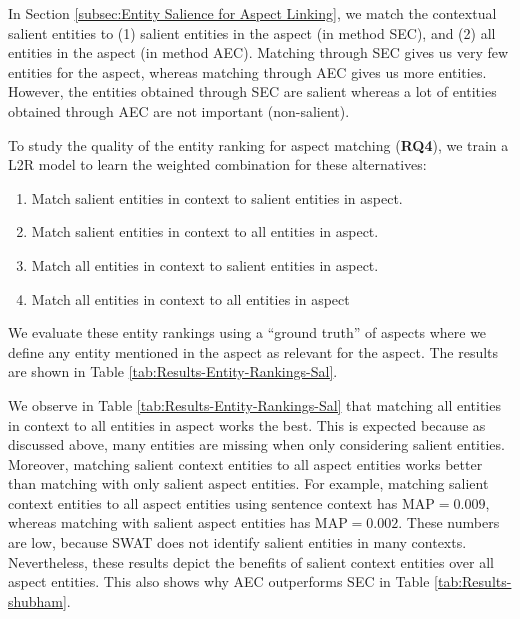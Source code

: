 In Section \ref{subsec:Entity Salience for Aspect Linking}, we match the contextual salient entities to (1) salient entities in the aspect (in method SEC), and (2) all entities in the aspect (in method AEC). Matching through SEC gives us very few entities for the aspect, whereas matching through AEC gives us more entities. However, the entities obtained through SEC are salient whereas a lot of entities obtained through AEC are not important (non-salient). 

To study the quality of the entity ranking for aspect matching (\textbf{RQ4}), we train a L2R model to learn the weighted combination for these alternatives:
\begin{enumerate}
    \item Match salient entities in context to salient entities in aspect.
    \item Match salient entities in context to all entities in aspect.
    \item Match all entities in context to salient entities in aspect.
    \item Match all entities in context to all entities in aspect
\end{enumerate}


We evaluate these entity rankings using a ``ground truth'' of aspects where we define any entity mentioned in the aspect as relevant for the aspect. The results are shown in Table \ref{tab:Results-Entity-Rankings-Sal}. 



We observe in Table \ref{tab:Results-Entity-Rankings-Sal} that matching all entities in context to all entities in aspect works the best. This is expected because as discussed above, many entities are missing when only considering salient entities. Moreover, matching salient context entities to all aspect entities works better than matching with only salient aspect entities. For example, matching salient context entities to all aspect entities using sentence context has $\text{MAP}=0.009$, whereas matching with salient aspect entities has $\text{MAP}=0.002$. These numbers are low, because SWAT does not identify salient entities in many contexts. Nevertheless,  these results depict the benefits of salient context entities over all aspect entities. This also shows why AEC outperforms SEC in Table \ref{tab:Results-shubham}.

